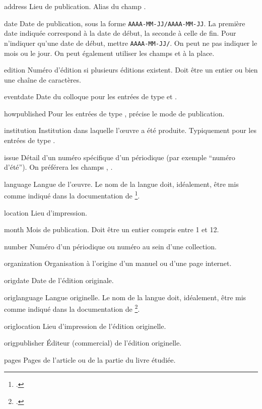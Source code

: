 \begin{choix}
	\item[address]
	Lieu de publication. Alias du champ .	
	\item[date] 
	Date de publication, sous la forme \verb|AAAA-MM-JJ/AAAA-MM-JJ|.
	La première date indiquée correspond à la date de début, la seconde à celle de fin. Pour n'indiquer qu'une date de début, mettre \verb|AAAA-MM-JJ/|. 
	On peut ne pas indiquer le mois ou le jour. On peut également utiliser les champs  et  à la place. 
   	\item[edition]
	Numéro d'édition si plusieurs éditions existent. Doit être un entier ou bien une chaîne de caractères.
   	\item[eventdate] Date du colloque pour les entrées de type  et . 
	\item[howpublished] Pour les entrées de type , précise le mode de publication.
   	\item[institution] Institution dans laquelle l'œuvre a été produite. Typiquement pour les entrées de type . 
   	\item[issue] Détail d'un numéro spécifique d'un périodique (par exemple \enquote{numéro d'été}). On préférera les champs , .	
   	\item[language] Langue de l'œuvre. Le nom de la langue doit, idéalement, être mis comme indiqué dans la documentation de \footcite{polyglossia}.					
   	\item[location] Lieu d'impression.  					
   	\item[month] Mois de publication. Doit être un entier compris entre 1 et 12. 
   	\item[number] Numéro d'un périodique ou numéro au sein d'une collection. 	
   	\item[organization] Organisation à l'origine d'un manuel ou d'une page internet.	
   	\item[origdate] Date de l'édition originale.						
   	\item[origlanguage] Langue originelle. Le nom de la langue doit, idéalement, être mis comme indiqué dans la documentation de \footcite{polyglossia}. 
   	\item[origlocation] Lieu d'impression de l'édition originelle.		
   	\item[origpublisher] Éditeur (commercial) de l'édition originelle.		
	\item[pages] Pages de l'article ou de la partie du livre étudiée. 

\end{choix}
